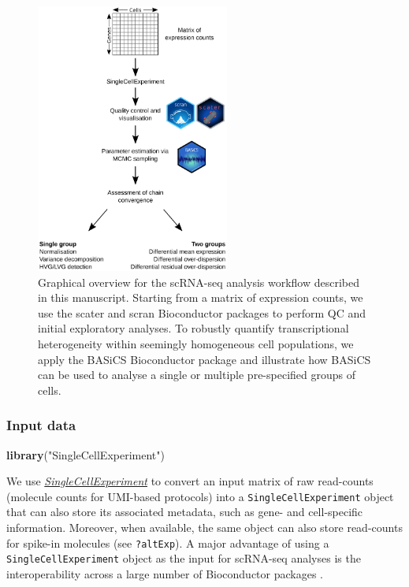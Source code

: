 \documentclass[9pt,a4paper,]{extarticle}
\newenvironment{Shaded}{\begin{snugshade}}{\end{snugshade}}
\newcommand{\KeywordTok}[1]{\textcolor[rgb]{0.13,0.29,0.53}{\textbf{#1}}}
\newcommand{\NormalTok}[1]{#1}
\newcommand{\StringTok}[1]{\textcolor[rgb]{0.31,0.60,0.02}{#1}}
\begin{document}
\begin{figure}

{\centering \includegraphics[width=2.5in,height=3.5in]{figure/Overview} 

}

\caption{Graphical overview for the scRNA-seq analysis workflow described in this manuscript. Starting from a matrix of expression counts, we use the scater and scran Bioconductor packages to perform QC and initial exploratory analyses. To robustly quantify transcriptional heterogeneity within seemingly homogeneous cell populations, we apply the BASiCS Bioconductor package and  illustrate how BASiCS can be used to analyse a single or multiple pre-specified groups of cells.}\label{fig:overview}
\end{figure}

\hypertarget{input-data}{%
\subsubsection{Input data}\label{input-data}}

\begin{Shaded}
\begin{Highlighting}[]
\KeywordTok{library}\NormalTok{(}\StringTok{"SingleCellExperiment"}\NormalTok{)}
\end{Highlighting}
\end{Shaded}

We use \emph{\href{https://bioconductor.org/packages/3.11/SingleCellExperiment}{SingleCellExperiment}} to convert an input
matrix of raw read-counts (molecule counts for UMI-based protocols) into a
\texttt{SingleCellExperiment} object that can also store its associated
metadata, such as gene- and cell-specific information.
Moreover, when available, the same object can also store read-counts for
spike-in molecules (see \texttt{?altExp}).
A major advantage of using a \texttt{SingleCellExperiment} object as the input for
scRNA-seq analyses is the interoperability across a large number of
Bioconductor packages \citep{Amezquita2019}.
\end{document}
